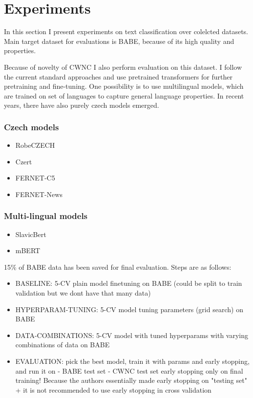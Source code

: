 \chapter{Experiments}\label{experiments}
In this section I present experiments on text classification over colelcted datasets. Main target dataset for evaluations is BABE, because of its high quality and properties.

Because of novelty of CWNC I also perform evaluation on this dataset.
I follow the current standard approaches and use pretrained transformers for further pretraining and fine-tuning. One possibility is to use multilingual models, which are trained on set of languages to capture general language properties. In recent years, there have also purely czech models emerged.
\subsection{Czech models}
\begin{itemize}
    \item RobeCZECH
    \item Czert
    \item FERNET-C5
    \item FERNET-News
\end{itemize}


\subsection{Multi-lingual models}
\begin{itemize}
    \item SlavicBert
    \item mBERT
\end{itemize}


 15\% of BABE data has been saved for final evaluation. Steps are as follows:
 \begin{itemize}
     \item BASELINE:
	5-CV plain model finetuning on BABE (could be split to train validation but we dont have that many data)
	\item HYPERPARAM-TUNING:
	5-CV model tuning parameters (grid search) on BABE
	\item DATA-COMBINATIONS:
	5-CV model with tuned hyperparams with varying combinations of data on BABE
	\item EVALUATION:
	pick the best model, train it with params and early stopping, and run it on - BABE test set 
										       - CWNC test set
	early stopping only on final training! Because the authors essentially made early stopping on "testing set" + it is not recommended to use early stopping in cross validation
 \end{itemize}
 
